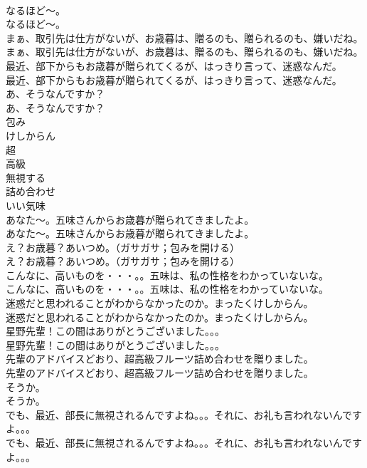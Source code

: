 \documentclass[8pt]{extreport}
\begin{document}
\begin{CJK}{UTF8}{min}
\\	なるほど～。	
\\	なるほど～。 
\\	まぁ、取引先は仕方がないが、お歳暮は、贈るのも、贈られるのも、嫌いだね。	
\\	まぁ、取引先は仕方がないが、お歳暮は、贈るのも、贈られるのも、嫌いだね。 
\\	最近、部下からもお歳暮が贈られてくるが、はっきり言って、迷惑なんだ。	
\\	最近、部下からもお歳暮が贈られてくるが、はっきり言って、迷惑なんだ。 
\\	あ、そうなんですか？	
\\	あ、そうなんですか？ 
\\	包み
\\	けしからん
\\	超
\\	高級
\\	無視する
\\	詰め合わせ
\\	いい気味
\\	あなた～。五味さんからお歳暮が贈られてきましたよ。	
\\	あなた～。五味さんからお歳暮が贈られてきましたよ。 
\\	え？お歳暮？あいつめ。（ガサガサ；包みを開ける）	
\\	え？お歳暮？あいつめ。（ガサガサ；包みを開ける） 
\\	こんなに、高いものを・・・。。五味は、私の性格をわかっていないな。	
\\	こんなに、高いものを・・・。。五味は、私の性格をわかっていないな。 
\\	迷惑だと思われることがわからなかったのか。まったくけしからん。	
\\	迷惑だと思われることがわからなかったのか。まったくけしからん。 
\\	星野先輩！この間はありがとうございました。。。	
\\	星野先輩！この間はありがとうございました。。。 
\\	先輩のアドバイスどおり、超高級フルーツ詰め合わせを贈りました。	
\\	先輩のアドバイスどおり、超高級フルーツ詰め合わせを贈りました。 
\\	そうか。	
\\	そうか。 
\\	でも、最近、部長に無視されるんですよね。。。それに、お礼も言われないんですよ。。。	
\\	でも、最近、部長に無視されるんですよね。。。それに、お礼も言われないんですよ。。。 

\end{CJK}
\end{document}

